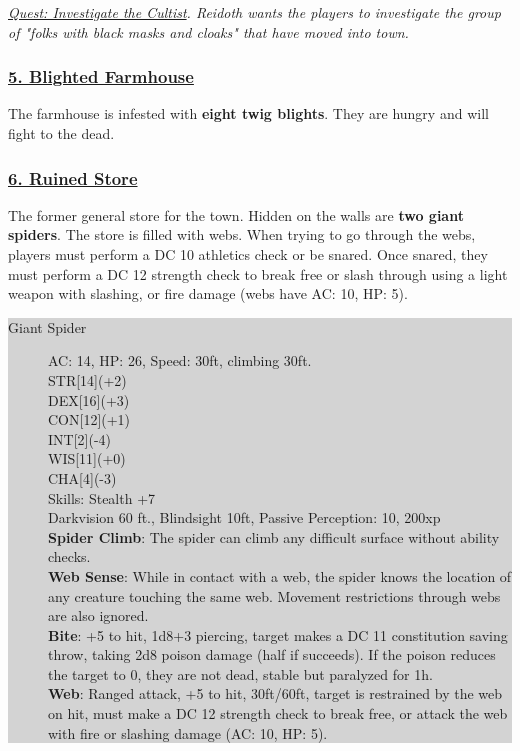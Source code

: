\emph{\underline{Quest: Investigate the Cultist}. Reidoth wants the players to investigate the group of "folks with black masks and cloaks" that have moved into town. }

\subsubsection*{\underline{5. Blighted Farmhouse}}
The farmhouse is infested with \textbf{eight twig blights}. They are hungry and will fight to the dead.

\subsubsection*{\underline{6. Ruined Store}}
The former general store for the town. Hidden on the walls are \textbf{two giant spiders}. 
The store is filled with webs. When trying to go through the webs, players must perform a DC 10 athletics check or be snared. Once snared, they must perform a DC 12 strength check to break free or slash through using a light weapon with slashing, or fire damage (webs have AC: 10, HP: 5).

\colorbox{lightgray}{\begin{minipage}{0.4\textwidth}
		\begin{description}
			\item[Giant Spider]
			AC: 14, HP: 26, Speed: 30ft, climbing 30ft.
			\\ STR[14](+2) 
			\\ DEX[16](+3)
			\\ CON[12](+1)
			\\ INT[2](-4)
			\\ WIS[11](+0)
			\\ CHA[4](-3)
			\\ Skills: Stealth +7
			\\ Darkvision 60 ft., Blindsight 10ft, Passive Perception: 10, 200xp
			\\ \textbf{Spider Climb}: The spider can climb any difficult surface without ability checks.
			\\ \textbf{Web Sense}: While in contact with a web, the spider knows the location of any creature touching the same web. Movement restrictions through webs are also ignored. 
			\\ \textbf{Bite}: +5 to hit, 1d8+3 piercing, target makes a DC 11 constitution saving throw, taking 2d8 poison damage (half if succeeds). If the poison reduces the target to 0, they are not dead, stable but paralyzed for 1h.
			\\ \textbf{Web}: Ranged attack, +5 to hit, 30ft/60ft, target is restrained by the web on hit, must make a DC 12 strength check to break free, or attack the web with fire or slashing damage (AC: 10, HP: 5).
		\end{description}
\end{minipage}}
\break

